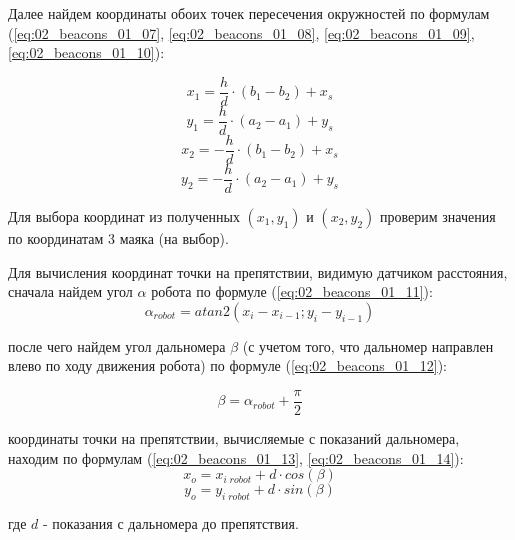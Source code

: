 Далее найдем координаты обоих точек пересечения окружностей по формулам (\ref{eq:02_beacons_01_07}, \ref{eq:02_beacons_01_08}, \ref{eq:02_beacons_01_09}, \ref{eq:02_beacons_01_10}):

\begin{equation}
x_1 = \frac{h}{d} \cdot (b_1 - b_2)+x_s
\label{eq:02_beacons_01_07}
\end{equation}
\begin{equation}
y_1 = \frac{h}{d} \cdot (a_2 - a_1)+y_s
\label{eq:02_beacons_01_08}
\end{equation}
\begin{equation}
x_2 = -\frac{h}{d} \cdot (b_1 - b_2)+x_s
\label{eq:02_beacons_01_09}
\end{equation}
\begin{equation}
y_2 = -\frac{h}{d} \cdot (a_2 - a_1)+y_s
\label{eq:02_beacons_01_10}
\end{equation}

Для выбора координат из полученных $(x_1, y_1)$ и $(x_2, y_2)$ проверим значения по координатам 3 маяка (на выбор).

Для вычисления координат точки на препятствии, видимую датчиком расстояния, сначала найдем угол $\alpha$ робота по формуле (\ref{eq:02_beacons_01_11}):
\begin{equation}
	\alpha_{robot} = atan2(x_i - x_{i-1};  y_i - y_{i-1})
	\label{eq:02_beacons_01_11}
\end{equation}

после чего найдем угол дальномера $\beta$ (с учетом того, что дальномер направлен влево по ходу движения робота) по формуле (\ref{eq:02_beacons_01_12}):

\begin{equation}
	\beta = \alpha_{robot} + \frac{\pi}{2}
	\label{eq:02_beacons_01_12}
\end{equation}

координаты точки на препятствии, вычисляемые с показаний дальномера, находим по формулам (\ref{eq:02_beacons_01_13}, \ref{eq:02_beacons_01_14}):
\begin{equation}
	x_o = x_{i\;robot} + d \cdot cos(\beta)
	\label{eq:02_beacons_01_13}
\end{equation}
\begin{equation}
	y_o = y_{i\;robot} + d \cdot sin(\beta)
	\label{eq:02_beacons_01_14}
\end{equation}

где $d$ - показания с дальномера до препятствия.
\\

